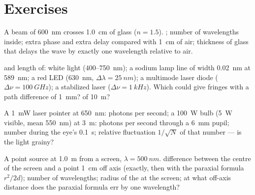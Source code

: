 \section{Exercises}

\begin{exercise}[$\star$]\label{exo:b2:scalar-light-model:1}
A beam of \qty{600}{nm} crosses \qty{1.0}{cm} of glass ($n = 1.5$). ; number of wavelengths inside; extra phase and extra delay
compared with \qty{1}{cm} of air; thickness of glass that delays the
wave by exactly one wavelength relative to air.
\end{exercise}

\begin{exercise}[$\star$]\label{exo:b2:scalar-light-model:2}
 and length of: white light ($400$--\qty{750}{nm}); a sodium
lamp line of width \qty{0.02}{nm} at \qty{589}{nm}; a red LED (\qty{630}{nm},
$\Delta\lambda = \qty{25}{nm}$); a multimode laser diode ($\Delta\nu = \qty{100}{GHz}$); a
stabilized laser ($\Delta\nu = \qty{1}{kHz}$). Which could give fringes with a
path difference of \qty{1}{mm}? of \qty{10}{m}?
\end{exercise}

\begin{exercise}[$\star$]\label{exo:b2:scalar-light-model:3}
A \qty{1}{mW} laser pointer at \qty{650}{nm}: photons per second; a
\qty{100}{W} bulb (\qty{5}{W} visible, mean \qty{550}{nm}) at \qty{3}{m}: photons per
second through a \qty{6}{mm} pupil; number during the eye's \qty{0.1}{s};
relative fluctuation $1/\sqrt N$ of that number --- is the light grainy?
\end{exercise}

\begin{exercise}[$\star$]\label{exo:b2:scalar-light-model:4}
A point source at \qty{1.0}{m} from a screen, $\lambda = \qty{500}{nm}$.  difference between the centre of the screen and a point \qty{1}{cm}
off axis (exactly, then with the paraxial formula $r^2/2d$); number of
wavelengths; radius of the  at the screen; at what off-axis
distance does the paraxial formula err by one wavelength?
\end{exercise}

